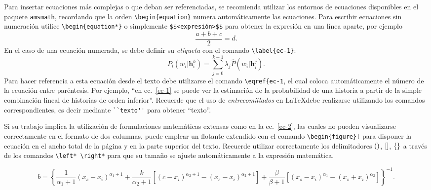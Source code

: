 \documentclass[esp]{FCEFyN-class}
\newcommand{\vect}[1]{\mathbf{#1}}  %
\begin{document}
Para insertar ecuaciones más complejas o que deban ser referenciadas, se recomienda utilizar los
entornos de ecuaciones disponibles en el paquete \verb!amsmath!, recordando que la orden 
\verb!\begin{equation}! numera automáticamente las ecuaciones. Para escribir ecuaciones sin
numeración utilice \verb!\begin{equation*}! o simplemente \verb!$$<expresión>$$! para
obtener la expresión en una línea aparte, por ejemplo $$ \frac{a + b + c}{2} = d. $$
En el caso de una ecuación numerada, se debe definir su \emph{etiqueta} con el comando
\verb!\label{ec-1}!:
\begin{equation} \label{ec-1}
 P_l(w_i|\vect{h}_i^{k}) = \sum_{j=0}^{k-1} \lambda_j \hat{P}(w_i|\vect{h}_i^{j}).
\end{equation}
Para hacer referencia a esta ecuación desde el texto debe utilizarse el comando \verb!\eqref{ec-1!,
el cual coloca automáticamente el número de la ecuación entre paréntesis. Por ejemplo, ``en
ec.~\eqref{ec-1} se puede ver la estimación de la probabilidad de una historia a partir de la simple
combinación lineal de historias de orden inferior''.
Recuerde que el uso de \emph{entrecomillados} en \LaTeX debe realizarse utilizando los comandos
correspondientes, es decir mediante \verb!``texto''! para obtener ``texto''.

Si su trabajo implica la utilización de formulaciones matemáticas extensas como en la
ec.~\eqref{ec-2}, las cuales no pueden visualizarse correctamente en el formato de dos columnas,
puede emplear un flotante extendido con el comando \verb!\begin{figure*}[! para disponer la ecuación
en el ancho total de la página y en la parte superior del texto.
Recuerde utilizar correctamente los delimitadores $(\mbox)$, $[\mbox]$, $\{\mbox\}$ a través de los
comandos \verb!\left* \right*! para que su tamaño se ajuste automáticamente a la expresión matemática.
\begin{figure*}[!t]
 \begin{equation}\label{ec-2}
   b = \left\{\frac{1}{\alpha_1 + 1}\left(x_s - x_i\right)^{\alpha_1+1} + \frac{k}{\alpha_2 + 1}
   \left[\left(c - x_i\right)^{\alpha_2+1} - \left(x_s - x_i\right)^{\alpha_2+1}\right]
   + \frac{\beta}{\beta + 1}\left[\left(x_s - x_i\right)^{\alpha_1} - 
   \left(x_s + x_i\right)^{\alpha_2}\right]\right\}^{-1}.
 \end{equation}
\end{figure*}
\end{document}
